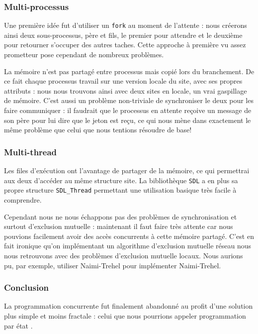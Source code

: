 \subsubsection{Multi-processus}
Une première idée fut d'utiliser un \texttt{fork} au moment de l'attente : nous créerons ainsi deux sous-processus, père et fils, le premier pour attendre et le deuxième pour retourner s'occuper des autres taches. Cette approche à première vu assez prometteur pose cependant de nombreux problèmes. 

La mémoire n'est pas partagé entre processus mais copié lors du branchement. De ce fait chaque processus travail sur une version locale du site, avec ses propres attributs : nous nous trouvons ainsi avec deux sites en locale, un vrai gaspillage de mémoire. C'est aussi un problème non-triviale de synchroniser le deux pour les faire communiquer : il faudrait que le processus en attente reçoive un message de son père pour lui dire que le jeton est reçu, ce qui nous mène dans exactement le même problème que celui que nous tentions résoudre de base!

\subsubsection{Multi-thread}
Les files d'exécution ont l'avantage de partager de la mémoire, ce qui permettrai aux deux d'accéder au même structure site. La bibliothèque \texttt{SDL} a en plus sa propre structure \texttt{SDL\_Thread} permettant une utilisation basique très facile à comprendre. 

Cependant nous ne nous échappons pas des problèmes de synchronisation et surtout d'exclusion mutuelle : maintenant il faut faire très attente car nous pouvions facilement avoir des accès concurrents à cette mémoire partagé. C'est en fait ironique qu'on implémentant un algorithme d'exclusion mutuelle réseau nous nous retrouvons avec des problèmes d'exclusion mutuelle locaux. Nous aurions pu, par exemple, utiliser Naimi-Trehel pour implémenter Naimi-Trehel.

\subsubsection{Conclusion}
La programmation concurrente fut finalement abandonné au profit d'une solution plus simple et moins \og fractale \fg{} : celui que nous pourrions appeler \og programmation par état \fg{}.